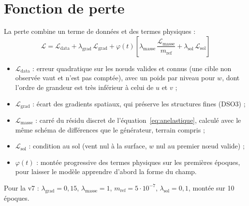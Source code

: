 \section{Fonction de perte}
La perte combine un terme de données et des termes physiques :
\begin{equation}
  \mathcal{L} = \mathcal{L}_{\mathrm{data}} + \lambda_{\mathrm{grad}}\,\mathcal{L}_{\mathrm{grad}}
  + \varphi(t)\left[\lambda_{\mathrm{masse}}\,\frac{\mathcal{L}_{\mathrm{masse}}}{m_{\mathrm{ref}}}
  + \lambda_{\mathrm{sol}}\,\mathcal{L}_{\mathrm{sol}}\right]
\end{equation}
\begin{itemize}
  \item $\mathcal{L}_{\mathrm{data}}$ : erreur quadratique sur les nœuds valides et connus (une
        cible non observée vaut  et n'est pas comptée), avec un poids par niveau pour $w$,
        dont l'ordre de grandeur est très inférieur à celui de $u$ et $v$ ;
  \item $\mathcal{L}_{\mathrm{grad}}$ : écart des gradients spatiaux, qui préserve les structures
        fines (DSO3) ;
  \item $\mathcal{L}_{\mathrm{masse}}$ : carré du résidu discret de l'équation~\eqref{eq:anelastique},
        calculé avec le même schéma de différences que le générateur, terrain compris ;
  \item $\mathcal{L}_{\mathrm{sol}}$ : condition au sol (vent nul à la surface, $w$ nul au premier
        nœud valide) ;
  \item $\varphi(t)$ : montée progressive des termes physiques sur les premières époques, pour
        laisser le modèle apprendre d'abord la forme du champ.
\end{itemize}
Pour la v7 : $\lambda_{\mathrm{grad}} = 0{,}15$, $\lambda_{\mathrm{masse}} = 1$,
$m_{\mathrm{ref}} = 5\cdot10^{-7}$, $\lambda_{\mathrm{sol}} = 0{,}1$, montée sur 10 époques.

